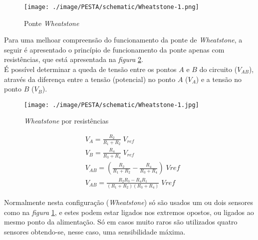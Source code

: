 \begin{minipage}[!b]{.4\linewidth}
\begin{figure}[H]
	\captionsetup{justification=raggedright,singlelinecheck=false}
	\flushleft
	\vspace{1cm}
	\texttt{[image: ./image/PESTA/schematic/Wheatstone-1.png]}
	\qquad \caption{Ponte \textit{Wheatstone}}
	\label{wheatstone-1}
\end{figure}
\end{minipage}
Para uma melhoar compreensão do funcionamento da ponte de \textit{Wheatstone}, a seguir é apresentado o princípio de funcionamento da ponte apenas com resistências, que está apresentada na \textit{figura} \ref{wheatstone-2}.
\\
É possível determinar a queda de tensão entre os pontos $A$ e $B$ do circuito ($V_{AB}$), através da diferença entre a tensão (potencial) no ponto $A$ ($V_A$) e a tensão no ponto $B$ ($V_B$).
\begin{minipage}[!b]{.45\linewidth}
	\begin{figure}[H]
		\captionsetup{justification=raggedright,singlelinecheck=false}
		\flushleft
		\texttt{[image: ./image/PESTA/schematic/Wheatstone-1.jpg]}
		\caption{\textit{Wheatstone} por resistências \cite{book-10}}
		\label{wheatstone-2}
	\end{figure}
\end{minipage}
\begin{minipage}[!b]{.5\linewidth}
	\setlength{\jot}{10pt}%
	\small
	\begin{align}
		\label{eq:wheatstone}
		&V_A =  \frac{R_2}{R_1 + R_2} \; V_{ref} \\ &V_B=\frac{R_4}{R_3 + R_4} \; V_{ref} \\
		&V_{AB}= \left(\frac{R_2}{R_1 + R_2} - \frac{R_4}{R_3 + R_4}\right) \; Vref \\
		&V_{AB} = \frac{R_2 R_3 - R_4 R_1}{(R_1 + R_2)(R_3 + R_4)} \; Vref
	\end{align}
\vspace{1pt}
\end{minipage}
Normalmente nesta configuração (\textit{Wheatstone}) só são usados um ou dois sensores como na \textit{figura} \ref{wheatstone-1}, e estes podem estar ligados nos extremos opostos, ou ligados ao mesmo ponto da alimentação. Só em casos muito raros são utilizados quatro sensores obtendo-se, nesse caso, uma sensibilidade máxima.
